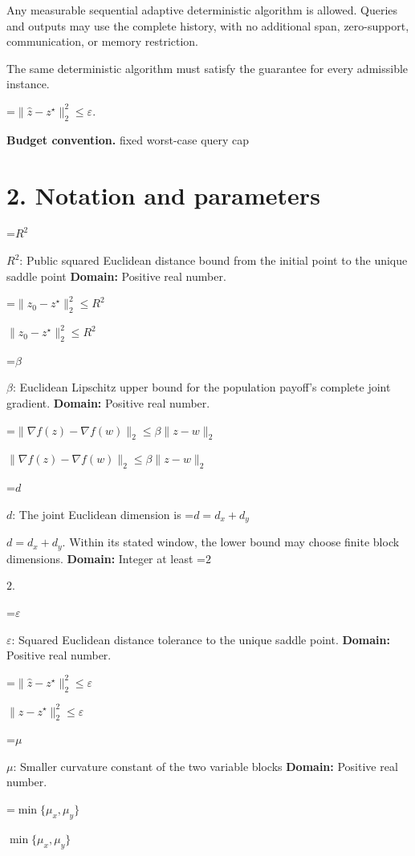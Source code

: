 \documentclass[10pt,a4paper]{article}
\newcommand{\AtlasMath}[1]{\par\begingroup\centering\setbox0=\hbox{$\displaystyle #1$}\ifdim\wd0>1.4\linewidth\typeout{ATLAS WIDE FORMULA: \the\wd0}\fi\ifdim\wd0>\linewidth\resizebox{\linewidth}{!}{\box0}\else\box0\fi\par\endgroup}
\newcommand{\AtlasInlineMath}[1]{\begingroup\setbox0=\hbox{$#1$}\ifdim\wd0>.4\linewidth\endgroup\AtlasMath{#1}\else\endgroup$#1$\fi}
\begin{document}
Any measurable sequential adaptive deterministic algorithm is allowed. Queries and outputs may use the complete history, with no additional span, zero-support, communication, or memory restriction.



The same deterministic algorithm must satisfy the guarantee for every admissible instance.




\AtlasMath{\|\widehat{z}-z^\star\|_2^2\le\varepsilon.}




\textbf{Budget convention.} fixed worst-case query cap



\section{2. Notation and parameters}


\AtlasInlineMath{R^2}: Public squared Euclidean distance bound from the initial point to the unique saddle point \textbf{Domain:} Positive real number.



\AtlasInlineMath{\|z_0-z^\star\|_2^2\le R^2}



\AtlasInlineMath{\beta}: Euclidean Lipschitz upper bound for the population payoff's complete joint gradient. \textbf{Domain:} Positive real number.



\AtlasInlineMath{\|\nabla f(z)-\nabla f(w)\|_2\le\beta\|z-w\|_2}



\AtlasInlineMath{d}: The joint Euclidean dimension is \AtlasInlineMath{d=d_x+d_y}. Within its stated window, the lower bound may choose finite block dimensions. \textbf{Domain:} Integer at least \AtlasInlineMath{2}.



\AtlasInlineMath{\varepsilon}: Squared Euclidean distance tolerance to the unique saddle point. \textbf{Domain:} Positive real number.



\AtlasInlineMath{\|\widehat z-z^\star\|_2^2\le\varepsilon}



\AtlasInlineMath{\mu}: Smaller curvature constant of the two variable blocks \textbf{Domain:} Positive real number.



\AtlasInlineMath{\min\{\mu_x,\mu_y\}}
\end{document}
